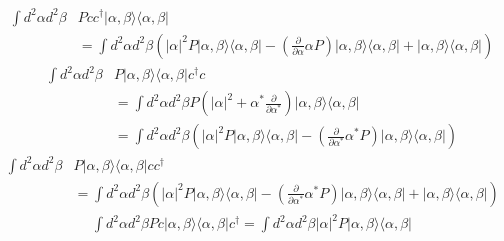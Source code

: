 \begin{equation}
\begin{aligned}
\int d^{2}\alpha d^{2}\beta & Pcc^{\dag}|\alpha,\beta\rangle \langle \alpha,\beta| \\
&= \int d^{2}\alpha d^{2}\beta \left(|\alpha|^{2}P|\alpha,\beta\rangle \langle \alpha,\beta|-(\frac{\partial}{\partial\alpha}\alpha P)|\alpha,\beta\rangle \langle \alpha,\beta|+|\alpha,\beta\rangle \langle \alpha,\beta|\right)
\end{aligned}
\end{equation}
\begin{equation}
\begin{aligned}
\int d^{2}\alpha d^{2}\beta & P|\alpha,\beta\rangle \langle \alpha,\beta|c^{\dag}c \\
&= \int d^{2}\alpha d^{2}\beta P(|\alpha|^{2}+\alpha^{*}\frac{\partial}{\partial\alpha^{*}})|\alpha,\beta\rangle \langle \alpha,\beta| \\
&= \int d^{2}\alpha d^{2}\beta \left(|\alpha|^{2}P|\alpha,\beta\rangle \langle \alpha,\beta|-(\frac{\partial}{\partial\alpha^{*}}\alpha^{*} P)|\alpha,\beta\rangle \langle \alpha,\beta|\right)
\end{aligned}
\end{equation}
\begin{equation}
\begin{aligned}
\int d^{2}\alpha d^{2}\beta & P|\alpha,\beta\rangle \langle \alpha,\beta|cc^{\dag} \\
&=\int d^{2}\alpha d^{2}\beta \left(|\alpha|^{2}P|\alpha,\beta\rangle \langle \alpha,\beta|-(\frac{\partial}{\partial\alpha^{*}}\alpha^{*} P)|\alpha,\beta\rangle \langle \alpha,\beta|+|\alpha,\beta\rangle \langle \alpha,\beta|\right)
\end{aligned}
\end{equation}
\begin{equation}
\begin{aligned}
\int d^{2}\alpha d^{2}\beta Pc|\alpha,\beta\rangle \langle \alpha,\beta|c^{\dag} = \int d^{2}\alpha d^{2}\beta |\alpha|^{2}P|\alpha,\beta\rangle \langle \alpha,\beta|
\end{aligned}
\end{equation}
